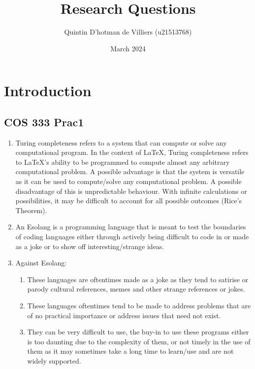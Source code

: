\documentclass{article}
\title{Research Questions}
\author{Quintin D'hotman de Villiers (u21513768)}
\date{March 2024}
\begin{document}
\maketitle

\section{Introduction}
\subsection*{COS 333 Prac1}

\begin{enumerate}
  \item Turing completeness refers to a system that can compute or solve any computational program.\cite{what-is-turing-complete} In the context of \LaTeX, Turing completeness refers to \LaTeX's ability to be programmed to compute almost any arbitrary computational problem.\cite{latex-turing-completeness} A possible advantage is that the system is versatile as it can be used to compute/solve any computational problem. A possible disadvantage of this is unpredictable behaviour.\cite{tex-turing-complete} With infinite calculations or possibilities, it may be difficult to account for all possible outcomes (Rice's Theorem\cite{rice-theorem}).
  
  \item An Esolang is a programming language that is meant to test the boundaries of coding languages either through actively being difficult to code in or made as a joke or to show off interesting/strange ideas.\cite{esolang-wiki}

  \item Against Esolang:
    \begin{enumerate}
      \item These languages are oftentimes made as a joke as they tend to satirise or parody cultural references, memes and other strange references or jokes.
      \item These languages oftentimes tend to be made to address problems that are of no practical importance or address issues that need not exist.
      \item They can be very difficult to use, the buy-in to use these programs either is too daunting due to the complexity of them, or not timely in the use of them as it may sometimes take a long time to learn/use and are not widely supported.
    \end{enumerate}
\end{enumerate}
\end{document}
